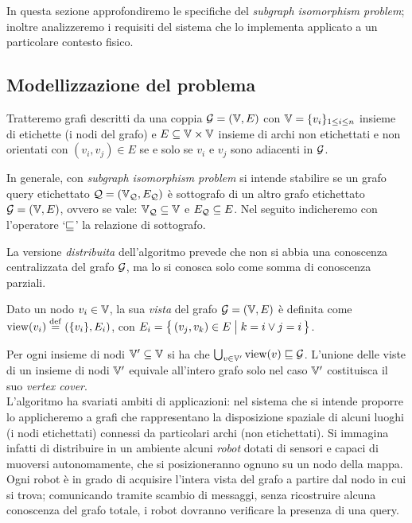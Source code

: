In questa sezione approfondiremo le specifiche del
\emph{subgraph isomorphism problem}; inoltre analizzeremo i
requisiti del sistema che lo implementa applicato a un particolare
contesto fisico.

\subsection{Modellizzazione del problema}
\label{sec:problem}
Tratteremo grafi descritti da una coppia
$\mathcal{G} = (\mathbb{V}, E)$ con $\mathbb{V} = \{ v_i \}_{1 \leq i \leq n}$ insieme di
etichette (i nodi del grafo) e $E \subseteq \mathbb{V} \times \mathbb{V}$
insieme di archi non etichettati e non orientati con
$(v_i, v_j) \in E$ se e solo se $v_i$ e $v_j$ sono adiacenti in $\mathcal{G}$.

In generale, con \emph{subgraph isomorphism problem} si intende
stabilire se un grafo query etichettato $\mathcal{Q} = (\mathbb{V}_{\mathcal{Q}}, E_{\mathcal{Q}})$ è
sottografo di un altro grafo etichettato $\mathcal{G} = ( \mathbb{V}, E)$,
ovvero se vale: $\mathbb{V}_{\mathcal{Q}} \subseteq \mathbb{V}$ e $E_{\mathcal{Q}} \subseteq E$.
Nel seguito indicheremo con l'operatore `$\sqsubseteq$' la relazione
di sottografo.

La versione \emph{distribuita} dell'algoritmo prevede che
non si abbia una conoscenza centralizzata del grafo $\mathcal{G}$,
ma lo si conosca solo come somma di conoscenza parziali.

\begin{definition}
Dato un nodo $v_i \in \mathbb{V}$, la sua \emph{vista} del grafo
$\mathcal{G} = (\mathbb{V}, E)$ è definita come $\view(v_i) \defeq (\{v_i\}, E_i)$, con
$E_i = \bigl\{\,(v_j, v_k) \in E \bigm| k = i \vee j = i \,\bigr\}$.
\end{definition}

Per ogni insieme di nodi $\mathbb{V}' \subseteq \mathbb{V}$ si ha che
$\bigcup_{v \in \mathbb{V}'} \mathrm{view}(v) \sqsubseteq \mathcal{G}$.
L'unione delle viste di un insieme di nodi $\mathbb{V}'$ equivale
all'intero grafo solo nel caso $\mathbb{V}'$ costituisca il suo
\emph{vertex cover}.\\

L'algoritmo ha svariati ambiti di applicazioni: nel sistema che si
intende proporre lo applicheremo a grafi che rappresentano la
disposizione spaziale di alcuni luoghi (i nodi etichettati)
connessi da particolari archi (non etichettati).
Si immagina infatti di distribuire in un ambiente alcuni \emph{robot}
dotati di sensori e capaci di muoversi autonomamente, che si
posizioneranno ognuno su un nodo della mappa.
Ogni robot è in grado di acquisire l'intera vista del grafo a partire
dal nodo in cui si trova;
comunicando tramite scambio di messaggi, senza ricostruire alcuna
conoscenza del grafo totale, i robot dovranno verificare la
presenza di una query.

